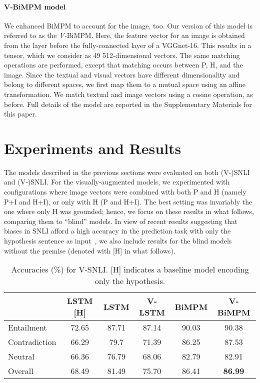 \documentclass[11pt]{article}
\begin{document}
\paragraph{V-BiMPM model}
We enhanced BiMPM to account for the image, too. Our version of this
model is referred to as the {\em V-}BiMPM.
Here, the feature vector for an image is obtained from the layer before the fully-connected layer of a VGGnet-16. This results in a  tensor, which we consider as 49 512-dimensional vectors.
The same matching operations are performed, except that matching occurs between P, H, and the image.
Since the textual and visual vectors have different dimensionality and belong to different spaces, we first map them to a mutual space using an affine transformation.
We match textual and image vectors using a cosine operation, as before. Full details of the model are reported in the Supplementary Materials for this paper.

 \section{Experiments and Results}
\label{sec:experiment}

The models described in the previous sections were evaluated on both
(V-)SNLI and (V-)SNLI. For the visually-augmented models, we
experimented with configurations where image vectors were combined
with both P and H (namely P+I and H+I), or only with H (P and
H+I). The best setting was invariably the one where only H was
grounded; hence, we focus on these results in what follows, comparing
them to ``blind'' models. In view of recent results suggesting that
biases in SNLI afford a high accuracy in the prediction task with only
the hypothesis sentence as input~\cite{guru:anno18}, we also include
results for the blind models without the premise (denoted with [H] in
what follows).

\begin{table}
\small
\begin{center}
\begin{tabular}{|l|c||cccc|}
\hline
  & LSTM [H] & LSTM & V-LSTM &   BiMPM &V-BiMPM \\\hline
Entailment &  72.65 &87.71 & 87.14 &  90.03 & 90.38  \\
Contradiction &  66.29 &79.7&  71.39  & 86.25 &  87.53  \\
Neutral & 66.36 & 76.79 &  68.06 &   82.79 & 82.91  \\\hline
Overall & 68.49 & 81.49 &  75.70 &   86.41 & \textbf{86.99} \\
\hline
\end{tabular}
\end{center}
\caption{Accuracies (\%) for V-SNLI. [H] indicates a baseline model encoding only the hypothesis.} \label{tab:snli}
\end{table}
\end{document}

